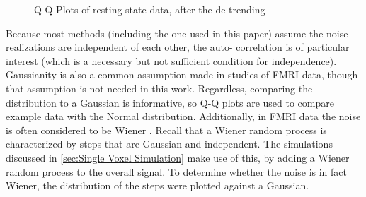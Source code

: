 \begin{figure}
\centering
{}
\caption{Q-Q Plots of resting state data, after the de-trending}
\label{fig:QQSpline}
\end{figure}

Because most methods (including the one used in this paper)
assume the noise realizations are independent of each other, the auto-
correlation is of particular interest (which is a necessary but not
sufficient condition for independence). Gaussianity is also a common
assumption made in studies of FMRI data, though that assumption is not
needed in this work. Regardless, comparing the distribution to a Gaussian
is informative, so Q-Q plots are used to compare example data with the
Normal distribution. Additionally, in FMRI data the noise is often considered 
to be Wiener \cite{Riera2003}. Recall that a Wiener random process is
characterized by steps that are Gaussian and independent. The simulations discussed in 
\autoref{sec:Single Voxel Simulation} make use of this, 
by adding a Wiener random process to the overall signal. To determine
whether the noise is in fact Wiener, the distribution of 
the steps were plotted against a Gaussian. 

